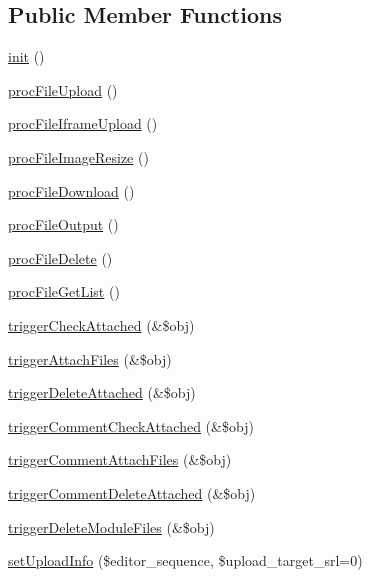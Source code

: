 \subsection*{Public Member Functions}
\begin{DoxyCompactItemize}
\item 
\hyperlink{classfileController_aea1086732740ff005a00f7152e30937d}{init} ()
\item 
\hyperlink{classfileController_a149fa7253922771172674963f700c2d6}{proc\-File\-Upload} ()
\item 
\hyperlink{classfileController_a423c909fc5841f83d9a965839180aad5}{proc\-File\-Iframe\-Upload} ()
\item 
\hyperlink{classfileController_a29e461f3cb7a84ddbb07b0abcdeef2e5}{proc\-File\-Image\-Resize} ()
\item 
\hyperlink{classfileController_a11ac8c819e791e103ed113b3927975af}{proc\-File\-Download} ()
\item 
\hyperlink{classfileController_a21d4fb5d44f6f078cc9d63b89e642dce}{proc\-File\-Output} ()
\item 
\hyperlink{classfileController_a05eff5de98e487cd806ae8fd1229d5dd}{proc\-File\-Delete} ()
\item 
\hyperlink{classfileController_ad1cdb6696de4e0c90532412bb80a359e}{proc\-File\-Get\-List} ()
\item 
\hyperlink{classfileController_ab23c495b5b662264a1c7adfda86f715f}{trigger\-Check\-Attached} (\&\$obj)
\item 
\hyperlink{classfileController_a307bc7f83988451603a052ed77db3895}{trigger\-Attach\-Files} (\&\$obj)
\item 
\hyperlink{classfileController_aaa8d73e09e5aa3a5a6807dffb578d84c}{trigger\-Delete\-Attached} (\&\$obj)
\item 
\hyperlink{classfileController_a6076133ce2b8d0c025c54547fbc9cc37}{trigger\-Comment\-Check\-Attached} (\&\$obj)
\item 
\hyperlink{classfileController_ab25a513258ef9c9e2dc2af274c9c24e7}{trigger\-Comment\-Attach\-Files} (\&\$obj)
\item 
\hyperlink{classfileController_ae1011288af2b3a2aca5bc4db41b9ad09}{trigger\-Comment\-Delete\-Attached} (\&\$obj)
\item 
\hyperlink{classfileController_a68fbf2cdcb182912d4138f269904a1ba}{trigger\-Delete\-Module\-Files} (\&\$obj)
\item 
\hyperlink{classfileController_a5cffda3cff8207351a7bd55065176c69}{set\-Upload\-Info} (\$editor\-\_\-sequence, \$upload\-\_\-target\-\_\-srl=0)

\end{DoxyCompactItemize}
